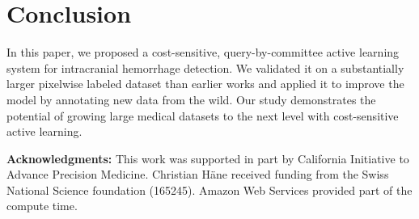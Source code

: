 \documentclass{llncs}
\begin{document}

\vspace*{-0.15cm}
\section{Conclusion}
\vspace*{-0.25cm}
In this paper, we proposed a cost-sensitive, query-by-committee active learning system for intracranial hemorrhage detection. We validated it on a substantially larger pixelwise labeled dataset than earlier works and applied it to improve the model by annotating new data from the wild. Our study demonstrates the potential of growing large medical  datasets to the next level with cost-sensitive active learning. 

\vspace{0.1cm}

\noindent \textbf{Acknowledgments:} This work was supported in part by California Initiative to Advance Precision Medicine. Christian H{\"a}ne received funding from the Swiss National Science foundation (165245). Amazon Web Services provided part of the compute time.

{\small


}
\end{document}
